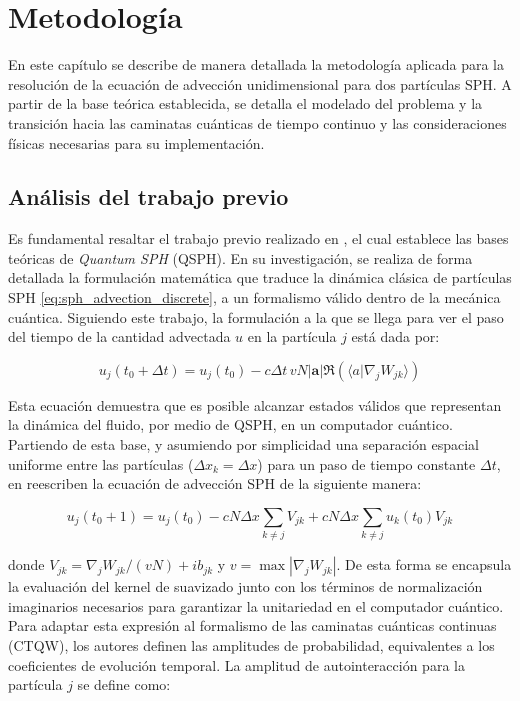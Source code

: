 
\chapter{Metodología}
\label{cap:metodologia}

En este capítulo se describe de manera detallada la metodología aplicada para la resolución de la ecuación de advección unidimensional para dos partículas SPH. A partir de la base teórica establecida, se detalla el modelado del problema y la transición hacia las caminatas cuánticas de tiempo continuo y las consideraciones físicas necesarias para su implementación.

\section{Análisis del trabajo previo}

Es fundamental resaltar el trabajo previo realizado en \cite{auyeung2024, auyeung2025}, el cual establece las bases teóricas de \emph{Quantum SPH} (QSPH). En su investigación, se realiza de forma detallada la formulación matemática que traduce la dinámica clásica de partículas SPH \eqref{eq:sph_advection_discrete}, a un formalismo válido dentro de la mecánica cuántica. Siguiendo este trabajo, la formulación a la que se llega para ver el paso del tiempo de la cantidad advectada $u$ en la partícula $j$ está dada por:

\begin{equation}
    u_j(t_0 + \Delta t) = u_j(t_0) - c \Delta t \, v N |\mathbf{a}| \Re(\langle a | \nabla_j W_{jk} \rangle)
    \label{eq:auyeung}
\end{equation}

Esta ecuación demuestra que es posible alcanzar estados válidos que representan la dinámica del fluido, por medio de QSPH, en un computador cuántico. Partiendo de esta base, y asumiendo por simplicidad una separación espacial uniforme entre las partículas ($\Delta x_k = \Delta x$) para un paso de tiempo constante $\Delta t$, en \cite{auyeung2025} reescriben la ecuación de advección SPH de la siguiente manera:

\begin{equation}
    u_j(t_0+1) = u_j(t_0) - c N \Delta x \sum_{k \neq j} V_{jk} + c N \Delta x \sum_{k \neq j} u_k(t_0) V_{jk}
    \label{eq:auyeung_14}
\end{equation}

donde $V_{jk} = \nabla_j W_{jk}/(vN) + ib_{jk} $ y $v = \max|\nabla_j W_{jk}|$. De esta forma se encapsula la evaluación del kernel de suavizado junto con los términos de normalización imaginarios necesarios para garantizar la unitariedad en el computador cuántico. Para adaptar esta expresión al formalismo de las caminatas cuánticas continuas (CTQW), los autores definen las amplitudes de probabilidad, equivalentes a los coeficientes de evolución temporal. La amplitud de autointeracción para la partícula $j$ se define como:

